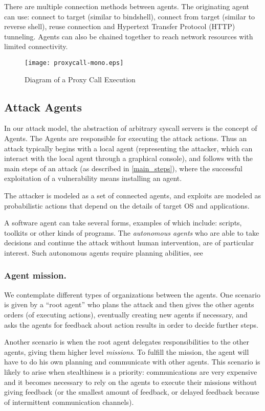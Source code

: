 \documentclass{llncs}
\begin{document}
There are multiple connection methods between agents. The originating agent can use:
connect to target (similar to bindshell), connect from target (similar to reverse shell), reuse connection and 
Hypertext Transfer Protocol (HTTP) tunneling. 
Agents can also be chained together to reach network resources with limited connectivity.

\begin{figure}[ht]
\centering
\texttt{[image: proxycall-mono.eps]}
\caption{Diagram of a Proxy Call Execution}
\label{syscalls1}
\end{figure}



\subsection{Attack Agents}

In our attack model, the abstraction of arbitrary syscall servers
is the concept of Agents.
The Agents are responsible for executing the attack actions.
Thus an attack typically begins with a local agent (representing the attacker, 
which can interact with the local agent through a graphical console),
and follows with the main steps of an attack (as described in \ref{main_steps}),
where the successful exploitation of a vulnerability means installing an agent. 

The attacker is modeled as a set of connected agents, and
exploits are modeled as probabilistic actions
that depend on the details of target OS and applications.

A software agent can take several forms,
examples of which include: scripts, toolkits or other
kinds of programs. The {\em autonomous agents}
who are able to take decisions and continue the attack
without human intervention, are of particular interest.
Such autonomous agents require planning abilities, see \cite{building}


\subsubsection{Agent mission.}

We contemplate different types of organizations between the agents.
One scenario is given by a ``root agent'' who plans the attack and
then gives the other agents orders (of executing actions), eventually
creating new agents if necessary, and asks the agents for 
feedback about action results in order to decide further steps.

Another scenario is when the root agent delegates responsibilities
to the other agents, giving them higher level {\em missions}.
To fulfill the mission, the agent will have to do his own planning
and communicate with other agents. This scenario is likely
to arise when stealthiness is a priority: communications are very
expensive and it becomes necessary to rely on the agents to
execute their missions without giving feedback (or the smallest
amount of feedback, or delayed feedback because of 
intermittent communication channels).
\end{document}
